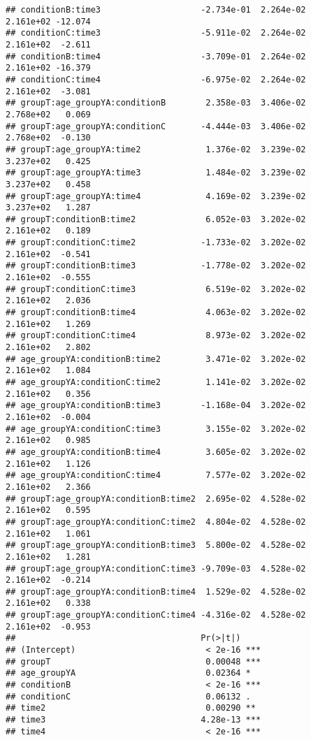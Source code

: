 \documentclass[]{article}
\begin{document}
\begin{verbatim}
## conditionB:time3                    -2.734e-01  2.264e-02  2.161e+02 -12.074
## conditionC:time3                    -5.911e-02  2.264e-02  2.161e+02  -2.611
## conditionB:time4                    -3.709e-01  2.264e-02  2.161e+02 -16.379
## conditionC:time4                    -6.975e-02  2.264e-02  2.161e+02  -3.081
## groupT:age_groupYA:conditionB        2.358e-03  3.406e-02  2.768e+02   0.069
## groupT:age_groupYA:conditionC       -4.444e-03  3.406e-02  2.768e+02  -0.130
## groupT:age_groupYA:time2             1.376e-02  3.239e-02  3.237e+02   0.425
## groupT:age_groupYA:time3             1.484e-02  3.239e-02  3.237e+02   0.458
## groupT:age_groupYA:time4             4.169e-02  3.239e-02  3.237e+02   1.287
## groupT:conditionB:time2              6.052e-03  3.202e-02  2.161e+02   0.189
## groupT:conditionC:time2             -1.733e-02  3.202e-02  2.161e+02  -0.541
## groupT:conditionB:time3             -1.778e-02  3.202e-02  2.161e+02  -0.555
## groupT:conditionC:time3              6.519e-02  3.202e-02  2.161e+02   2.036
## groupT:conditionB:time4              4.063e-02  3.202e-02  2.161e+02   1.269
## groupT:conditionC:time4              8.973e-02  3.202e-02  2.161e+02   2.802
## age_groupYA:conditionB:time2         3.471e-02  3.202e-02  2.161e+02   1.084
## age_groupYA:conditionC:time2         1.141e-02  3.202e-02  2.161e+02   0.356
## age_groupYA:conditionB:time3        -1.168e-04  3.202e-02  2.161e+02  -0.004
## age_groupYA:conditionC:time3         3.155e-02  3.202e-02  2.161e+02   0.985
## age_groupYA:conditionB:time4         3.605e-02  3.202e-02  2.161e+02   1.126
## age_groupYA:conditionC:time4         7.577e-02  3.202e-02  2.161e+02   2.366
## groupT:age_groupYA:conditionB:time2  2.695e-02  4.528e-02  2.161e+02   0.595
## groupT:age_groupYA:conditionC:time2  4.804e-02  4.528e-02  2.161e+02   1.061
## groupT:age_groupYA:conditionB:time3  5.800e-02  4.528e-02  2.161e+02   1.281
## groupT:age_groupYA:conditionC:time3 -9.709e-03  4.528e-02  2.161e+02  -0.214
## groupT:age_groupYA:conditionB:time4  1.529e-02  4.528e-02  2.161e+02   0.338
## groupT:age_groupYA:conditionC:time4 -4.316e-02  4.528e-02  2.161e+02  -0.953
##                                     Pr(>|t|)    
## (Intercept)                          < 2e-16 ***
## groupT                               0.00048 ***
## age_groupYA                          0.02364 *  
## conditionB                           < 2e-16 ***
## conditionC                           0.06132 .  
## time2                                0.00290 ** 
## time3                               4.28e-13 ***
## time4                                < 2e-16 ***

\end{verbatim}
\end{document}
